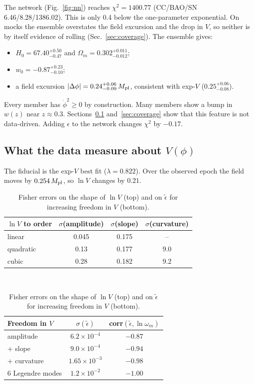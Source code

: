 \documentclass[11pt,a4paper]{article}
\newcommand{\Mpl}{M_{\rm pl}}
\newcommand{\et}{\tilde\epsilon}
\begin{document}
The network (Fig.~\ref{fig:nn}) reaches $\chi^2=1400.77$ (CC/BAO/SN 6.46/8.28/1386.02). This is only 0.4 below the one-parameter exponential. On mocks the ensemble overstates the field excursion and the drop in $V$, so neither is by itself evidence of rolling (Sec.~\ref{sec:coverage}). The ensemble gives:
\begin{itemize}
\item $H_0=67.40^{+0.50}_{-0.47}$ and $\Omega_m=0.302^{+0.011}_{-0.012}$;
\item $w_0=-0.87^{+0.23}_{-0.10}$;
\item a field excursion $|\Delta\phi|=0.24^{+0.06}_{-0.09}\,\Mpl$, consistent with exp-$V$ ($0.25^{+0.06}_{-0.08}$).
\end{itemize}
Every member has $\dot\phi^2\ge0$ by construction. Many members show a bump in $w(z)$ near $z\approx0.3$. Sections~\ref{sec:fisher} and~\ref{sec:coverage} show that this feature is not data-driven. Adding $\epsilon$ to the network changes $\chi^2$ by $-0.17$.

\subsection{What the data measure about $V(\phi)$}\label{sec:fisher}
The fiducial is the exp-$V$ best fit ($\lambda=0.822$). Over the observed epoch the field moves by $0.254\,\Mpl$, so $\ln V$ changes by $0.21$.

\begin{table}[h]\centering\small
\caption{Fisher errors on the shape of $\ln V$ (top) and on $\et$ for increasing freedom in $V$ (bottom).}\label{tab:fisher}
\begin{tabular}{lccc}\toprule
$\ln V$ to order & $\sigma$(amplitude) & $\sigma$(slope) & $\sigma$(curvature)\\\midrule
linear & 0.045 & 0.175 & --\\
quadratic & 0.13 & 0.177 & 9.0\\
cubic & 0.28 & 0.182 & 9.2\\\bottomrule
\end{tabular}\\[8pt]
\begin{tabular}{lcc}\toprule
Freedom in $V$ & $\sigma(\et)$ & corr$(\et,\ln\omega_m)$\\\midrule
amplitude & $6.2\times10^{-4}$ & $-0.87$\\
+ slope & $9.0\times10^{-4}$ & $-0.94$\\
+ curvature & $1.65\times10^{-3}$ & $-0.98$\\
6 Legendre modes & $1.2\times10^{-2}$ & $-1.00$\\\bottomrule
\end{tabular}
\end{table}
\end{document}
